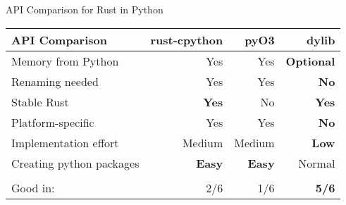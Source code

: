\begin{frame}[c]{API Comparison for Rust in Python}
    \normalsize

\begin{tabular}{@{}lrrr@{}}
    \textbf{API Comparison} & rust-cpython & pyO3 & dylib \\
    \hline
    Memory from Python              & Yes           & Yes & \textbf{Optional} \\
    Renaming needed                 & Yes           & Yes & \textbf{No} \\
    Stable Rust                     & \textbf{Yes}  & No  & \textbf{Yes} \\
    Platform-specific               & Yes           & Yes & \textbf{No} \\
    Implementation effort           & Medium        & Medium & \textbf{Low} \\
    Creating python packages        & \textbf{Easy} & \textbf{Easy} & Normal \\ \\
    \hline
    Good in: & 2/6 & 1/6 & \textbf{5/6} \\
\end{tabular}
\end{frame}





